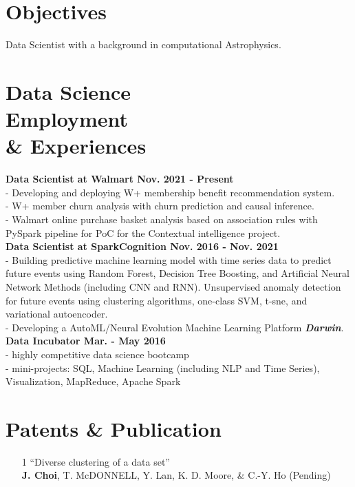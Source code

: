 \documentclass[margin,centered]{res}
\begin{document}
\begin{resume}

\vspace{-0.0cm}
\section{Objectives} Data Scientist with a background in computational Astrophysics.


\section{Data Science \\ Employment \\ \& Experiences}
{\bf Data Scientist at Walmart Nov. 2021 - Present} \\
- Developing and deploying W+ membership benefit recommendation system.\\
- W+ member churn analysis with churn prediction and causal inference.\\
- Walmart online purchase basket analysis based on association rules with PySpark pipeline for PoC for the Contextual intelligence project.\\
{\bf Data Scientist at SparkCognition Nov. 2016 - Nov. 2021} \\
- Building predictive machine learning model with time series data to predict future events using Random Forest, Decision Tree Boosting, and Artificial Neural Network Methods (including CNN and RNN). Unsupervised anomaly detection for future events using clustering algorithms, one-class SVM, t-sne, and variational autoencoder. \\
- Developing a AutoML/Neural Evolution Machine Learning Platform {\bf {\it Darwin}}.\\
{\bf Data Incubator Mar. - May 2016}  \\
- highly competitive data science bootcamp \\
- mini-projects: SQL, Machine Learning (including NLP and Time Series), Visualization, MapReduce, Apache Spark \\

\section{Patents \& Publication}
\begin{enumerate}
\item[1] ``Diverse clustering of a data set'' \\ \textbf{J. Choi}, T. McDONNELL, Y. Lan, K. D. Moore, \& C.-Y. Ho (Pending)


\end{enumerate}
\end{resume}
\end{document}
